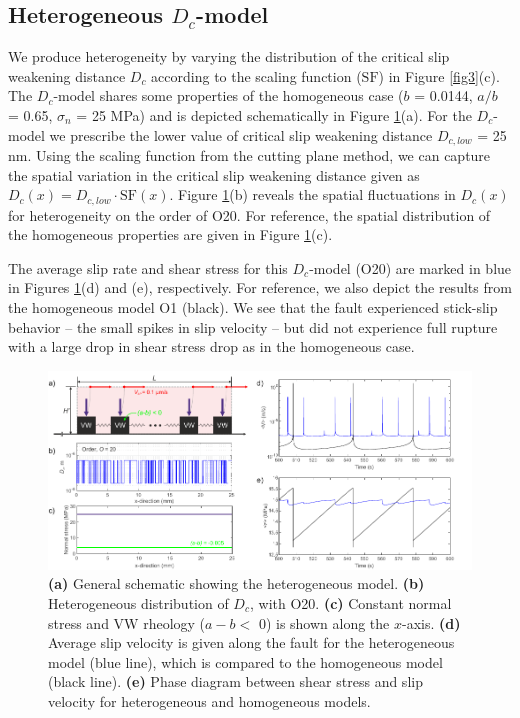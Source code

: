 \documentclass[preprint,1p, 10pt,authoryear]{elsarticle}
\begin{document}
\subsection{Heterogeneous $D_{c}$-model}
We produce heterogeneity by varying the distribution of the critical slip weakening distance $D_{c}$ according to the scaling function ($\mathrm{SF}$) in Figure \ref{fig3}(c). The $D_{c}$-model shares some properties of the homogeneous case ($b$ = 0.0144, $a/b$ = 0.65, $\sigma_{n}$ = 25 MPa) and is depicted schematically in Figure \ref{fig6}(a). For the $D_{c}$-model we prescribe the lower value of critical slip weakening distance $D_{c,low}$ = 25 nm. Using the scaling function from the cutting plane method, we can capture the spatial variation in the critical slip weakening distance given as $D_{c}(x) = D_{c,low} \cdot \mathrm{SF}(x)$. Figure \ref{fig6}(b) reveals the spatial fluctuations in $D_{c}(x)$ for heterogeneity on the order of O20. For reference, the spatial distribution of the homogeneous properties are given in Figure \ref{fig6}(c).
 
The average slip rate and shear stress for this $D_{c}$-model (O20) are marked in blue in Figures \ref{fig6}(d) and (e), respectively. For reference, we also depict the results from the homogeneous model O1 (black). We see that the fault experienced stick-slip behavior -- the small spikes in slip velocity -- but did not experience full rupture with a large drop in shear stress drop as in the homogeneous case. 

 \begin{figure}
	\centering
	\includegraphics{FIG6_revised.pdf} 
	\caption{\textbf{(a)} General schematic showing the heterogeneous model. \textbf{(b)} Heterogeneous distribution of $D_{c}$, with O20. \textbf{(c)} Constant normal stress and VW rheology ($a-b <$ 0) is shown along the $x$-axis.  \textbf{(d)} Average slip velocity is given along the fault for the heterogeneous model (blue line), which is compared to the homogeneous model (black line). \textbf{(e)} Phase diagram between shear stress and slip velocity for heterogeneous and homogeneous models.}
	\label{fig6}
\end{figure}
 
\end{document}
